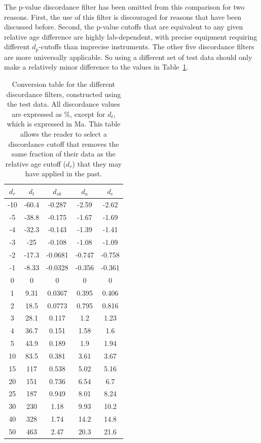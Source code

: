 \documentclass[gchron, manuscript]{copernicus}
\begin{document}
The p-value discordance filter has been omitted from this comparison
for two reasons. First, the use of this filter is discouraged for
reasons that have been discussed before. Second, the p-value cutoffs
that are equivalent to any given relative age difference are highly
lab-dependent, with precise equipment requiring different
$d_p$-cutoffs than imprecise instruments. The other five discordance
filters are more universally applicable. So using a different set of
test data should only make a relatively minor difference to the values
in Table~\ref{tab:conversiontable}.

\begin{table}
  \begin{tabular}{c|cccc}
    $d_r$ & $d_t$ & $d_{sk}$ & $d_a$ & $d_c$ \\ \hline
    -10 & -60.4 & -0.287 & -2.59 & -2.62 \\
    -5 & -38.8 & -0.175 & -1.67 & -1.69 \\
    -4 & -32.3 & -0.143 & -1.39 & -1.41 \\
    -3 & -25 & -0.108 & -1.08 & -1.09 \\
    -2 & -17.3 & -0.0681 & -0.747 & -0.758 \\
    -1 & -8.33 & -0.0328 & -0.356 & -0.361 \\
    0 & 0 & 0 & 0 & 0 \\
    1 & 9.31 & 0.0367 & 0.395 & 0.406 \\
    2 & 18.5 & 0.0773 & 0.795 & 0.816 \\
    3 & 28.1 & 0.117 & 1.2 & 1.23 \\
    4 & 36.7 & 0.151 & 1.58 & 1.6 \\
    5 & 43.9 & 0.189 & 1.9 & 1.94 \\
    10 & 83.5 & 0.381 & 3.61 & 3.67 \\
    15 & 117 & 0.538 & 5.02 & 5.16 \\
    20 & 151 & 0.736 & 6.54 & 6.7 \\
    25 & 187 & 0.949 & 8.01 & 8.24 \\
    30 & 230 & 1.18 & 9.93 & 10.2 \\
    40 & 328 & 1.74 & 14.2 & 14.8 \\
    50 & 463 & 2.47 & 20.3 & 21.6
  \end{tabular}
  \caption{Conversion table for the different discordance filters,
    constructed using the test data. All discordance values are
    expressed as \%, except for $d_t$, which is expressed in Ma. This
    table allows the reader to select a discordance cutoff that
    removes the same fraction of their data as the relative age cutoff
    ($d_r$) that they may have applied in the past. }
  \label{tab:conversiontable}
\end{table}
\end{document}
